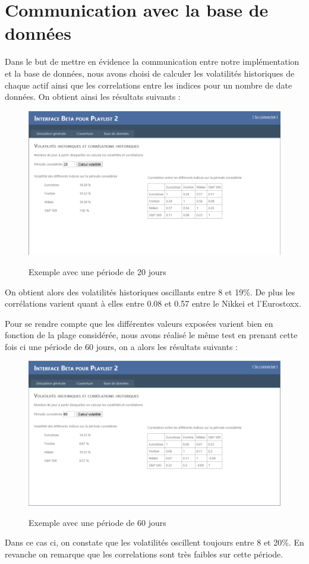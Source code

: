 \documentclass[french,12pt,a4paper]{article}
\begin{document}
\section{Communication avec la base de données}

Dans le but de mettre en évidence la communication entre notre implémentation et la base de données, nous avons choisi de calculer les volatilités historiques de chaque actif ainsi que les correlations entre les indices pour un nombre de date données. On obtient ainsi les résultats suivants :

\begin{center}
\begin{figure}[h!]
    \caption{Exemple avec une période de 20 jours}
    \includegraphics[scale=0.45]{Manuel2.png}
    \label{fig:PropProf}
\end{figure}
\end{center} 

On obtient alors des volatilités historiques oscillants entre 8 et 19\%. De plus les corrélations varient quant à elles entre 0.08 et 0.57 entre le Nikkei et l'Eurostoxx.

Pour se rendre compte que les différentes valeurs exposées varient bien en fonction de la plage considérée, nous avons réalisé le même test en prenant cette fois ci une période de 60 jours, on a alors les résultats suivants :

\begin{center}
\begin{figure}[h!]
    \caption{Exemple avec une période de 60 jours}
    \includegraphics[scale=0.45]{Manuel1.png}
    \label{fig:PropProf}
\end{figure}
\end{center} 

Dans ce cas ci, on constate que les volatilités oscillent toujours entre 8 et 20\%. En revanche on remarque que les correlations sont très faibles sur cette période. 
\end{document}

